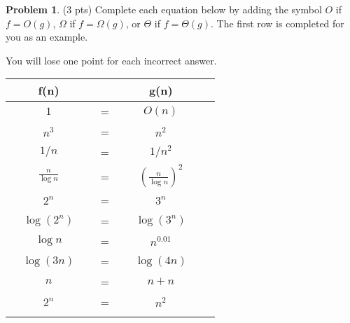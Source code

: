 \documentclass[12pt]{exam}
\newcommand*{\hl}[1]{\colorbox{yellow}{#1}}
\newcommand*{\answerLong}[2]{
    \ifprintanswers{\hl{#1}}
\else{#2}
\fi
}
\newcommand*{\answer}[1]{\answerLong{#1}{~}}
\theoremstyle{definition}
\newtheorem{problem}{Problem}
\begin{document}
\newpage
\begin{problem}
(3 pts)
    Complete each equation below by adding the symbol $O$ if $f=O(g)$, $\Omega$ if $f=\Omega(g)$, or $\Theta$ if $f=\Theta(g)$.  
    The first row is completed for you as an example.

    You will lose one point for each incorrect answer.

{\renewcommand{\arraystretch}{3.4}
\begin{tabular}{c c c c c c}
    & f(n) &~\hspace{0.5in}~$ $~\hspace{0.5in}~& g(n) &\\
    \hline
    & $1$ & ~\hspace{0.5in}~$=$~\hspace{0.5in}~  & $O(n)$ &  &\\
    \arrayrulecolor{gray}\hline
    & $n^3$ & ~\hspace{0.5in}~$=$~\hspace{0.5in}~  & \answer{$\Omega$} $n^2$ &  &\\
    \arrayrulecolor{gray}\hline
    & $1/n$ & ~\hspace{0.5in}~$=$~\hspace{0.5in}~  & \answer{$\Omega$} $1/n^2$ &  &\\
    \arrayrulecolor{gray}\hline
    & $\frac n {\log n}$ & ~\hspace{0.5in}~$=$~\hspace{0.5in}~  & \answer{$O$} $\left(\frac n {\log n}\right)^2$ &  &\\
    \arrayrulecolor{gray}\hline
    & $2^{n}$ & ~\hspace{0.5in}~$=$~\hspace{0.5in}~  & \answer{$O$} $3^n$ &  &\\
    \arrayrulecolor{gray}\hline
    & $\log (2^n)$ & ~\hspace{0.5in}~$=$~\hspace{0.5in}~  & \answer{$\Theta$} $\log (3^n)$ &  &\\
    \arrayrulecolor{gray}\hline
    & $\log n$ & ~\hspace{0.5in}~$=$~\hspace{0.5in}~  & \answer{$O$} $n^{0.01}$ &  &\\
    \arrayrulecolor{gray}\hline
    & $\log (3n)$ & ~\hspace{0.5in}~$=$~\hspace{0.5in}~  & \answer{$\Theta$} $\log (4n)$ &  &\\
    \arrayrulecolor{gray}\hline
    & $n$ & ~\hspace{0.5in}~$=$~\hspace{0.5in}~  & \answer{$\Theta$} $n+n$ &  &\\
    \arrayrulecolor{gray}\hline
    & $2^n$ & ~\hspace{0.5in}~$=$~\hspace{0.5in}~  & \answer{$\Omega$} $n^2$ &  &\\
    \arrayrulecolor{gray}\hline


\end{tabular}}
\end{problem}
\end{document}
